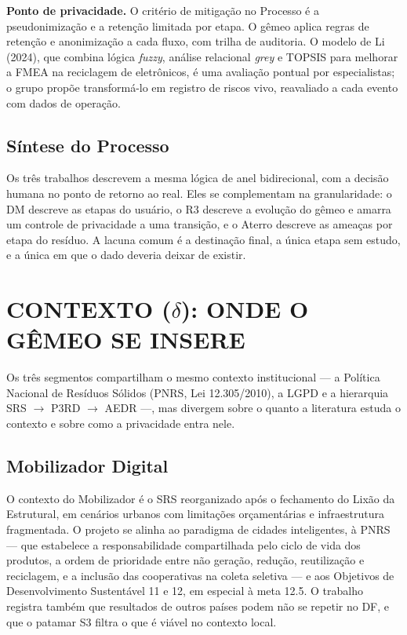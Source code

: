 \documentclass[12pt,a4paper,article,oneside,english,brazil]{abntex2}
\begin{document}
\textbf{Ponto de privacidade.} O critério de mitigação no Processo é a pseudonimização e a retenção limitada por etapa. O gêmeo aplica regras de retenção e anonimização a cada fluxo, com trilha de auditoria. O modelo de Li (2024), que combina lógica \textit{fuzzy}, análise relacional \textit{grey} e TOPSIS para melhorar a FMEA na reciclagem de eletrônicos, é uma avaliação pontual por especialistas; o grupo propõe transformá-lo em registro de riscos vivo, reavaliado a cada evento com dados de operação.

\subsection{Síntese do Processo}

Os três trabalhos descrevem a mesma lógica de anel bidirecional, com a decisão humana no ponto de retorno ao real. Eles se complementam na granularidade: o DM descreve as etapas do usuário, o R3 descreve a evolução do gêmeo e amarra um controle de privacidade a uma transição, e o Aterro descreve as ameaças por etapa do resíduo. A lacuna comum é a destinação final, a única etapa sem estudo, e a única em que o dado deveria deixar de existir.

\section{CONTEXTO (\texorpdfstring{$\delta$}{delta}): ONDE O GÊMEO SE INSERE}

Os três segmentos compartilham o mesmo contexto institucional --- a Política Nacional de Resíduos Sólidos (PNRS, Lei 12.305/2010), a LGPD e a hierarquia SRS $\rightarrow$ P3RD $\rightarrow$ AEDR ---, mas divergem sobre o quanto a literatura estuda o contexto e sobre como a privacidade entra nele.

\subsection{Mobilizador Digital}

O contexto do Mobilizador é o SRS reorganizado após o fechamento do Lixão da Estrutural, em cenários urbanos com limitações orçamentárias e infraestrutura fragmentada. O projeto se alinha ao paradigma de cidades inteligentes, à PNRS --- que estabelece a responsabilidade compartilhada pelo ciclo de vida dos produtos, a ordem de prioridade entre não geração, redução, reutilização e reciclagem, e a inclusão das cooperativas na coleta seletiva --- e aos Objetivos de Desenvolvimento Sustentável 11 e 12, em especial à meta 12.5. O trabalho registra também que resultados de outros países podem não se repetir no DF, e que o patamar S3 filtra o que é viável no contexto local.
\end{document}
